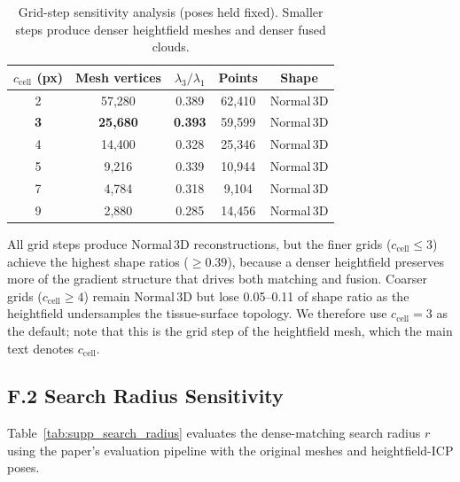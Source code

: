 \documentclass[review]{elsarticle}
\begin{document}
\begin{table}[h]
\centering
\caption{Grid-step sensitivity analysis (poses held fixed). Smaller steps produce denser heightfield meshes and denser fused clouds.}
\label{tab:supp_cell_size}
\setlength{\tabcolsep}{4pt}
\renewcommand{\arraystretch}{1.05}
\begin{tabular}{ccccc}
\toprule
$c_{\mathrm{cell}}$ (px) & Mesh vertices & $\lambda_3/\lambda_1$ & Points & Shape \\
\midrule
2 & 57{,}280 & 0.389 & 62{,}410 & Normal\,3D \\
\textbf{3} & \textbf{25{,}680} & \textbf{0.393} & 59{,}599 & Normal\,3D \\
4 & 14{,}400 & 0.328 & 25{,}346 & Normal\,3D \\
5 & 9{,}216 & 0.339 & 10{,}944 & Normal\,3D \\
7 & 4{,}784 & 0.318 & 9{,}104 & Normal\,3D \\
9 & 2{,}880 & 0.285 & 14{,}456 & Normal\,3D \\
\bottomrule
\end{tabular}
\end{table}

All grid steps produce Normal\,3D reconstructions, but the finer grids ($c_{\mathrm{cell}} \leq 3$) achieve the highest shape ratios ($\geq 0.39$), because a denser heightfield preserves more of the gradient structure that drives both matching and fusion.
Coarser grids ($c_{\mathrm{cell}} \geq 4$) remain Normal\,3D but lose 0.05--0.11 of shape ratio as the heightfield undersamples the tissue-surface topology.
We therefore use $c_{\mathrm{cell}}{=}3$ as the default; note that this is the grid step of the heightfield mesh, which the main text denotes $c_{\mathrm{cell}}$.

\subsection*{F.2 Search Radius Sensitivity}

Table~\ref{tab:supp_search_radius} evaluates the dense-matching search radius $r$ using the paper's evaluation pipeline with the original meshes and heightfield-ICP poses.
\end{document}
